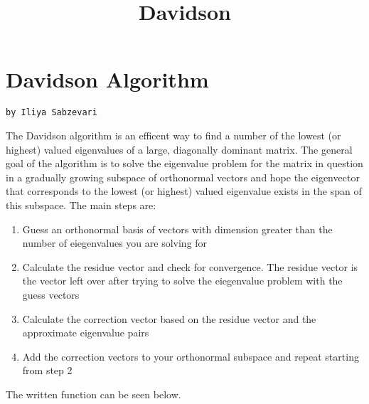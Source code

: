 \documentclass[11pt]{article}
\title{Davidson}
\providecommand{\tightlist}{%
      \setlength{\itemsep}{0pt}\setlength{\parskip}{0pt}}
\begin{document}
    
    
    \maketitle
    
    

    
    \section{Davidson Algorithm}\label{davidson-algorithm}

\begin{verbatim}
by Iliya Sabzevari
\end{verbatim}

    The Davidson algorithm is an efficent way to find a number of the lowest
(or highest) valued eigenvalues of a large, diagonally dominant matrix.
The general goal of the algorithm is to solve the eigenvalue problem for
the matrix in question in a gradually growing subspace of orthonormal
vectors and hope the eigenvector that corresponds to the lowest (or
highest) valued eigenvalue exists in the span of this subspace. The main
steps are:

\begin{enumerate}
\def\labelenumi{\arabic{enumi}.}
\tightlist
\item
  Guess an orthonormal basis of vectors with dimension greater than the
  number of eiegenvalues you are solving for
\item
  Calculate the residue vector and check for convergence. The residue
  vector is the vector left over after trying to solve the eiegenvalue
  problem with the guess vectors
\item
  Calculate the correction vector based on the residue vector and the
  approximate eigenvalue pairs
\item
  Add the correction vectors to your orthonormal subspace and repeat
  starting from step 2
\end{enumerate}

The written function can be seen below.
\end{document}

